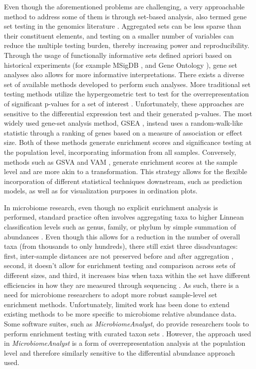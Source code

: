\documentclass[10pt,letterpaper]{article}
\begin{document}
Even though the aforementioned problems are challenging, a very approachable method to address some of them is through set-based analysis, also termed gene set testing in the genomics literature \cite{khatri2012, goeman2007}. Aggregated sets can be less sparse than their constituent elements, and testing on a smaller number of variables can reduce the multiple testing burden, thereby increasing power and reproducibility. Through the usage of functionally informative sets defined apriori based on historical experiments (for example MSigDB \cite{subramanian2005}, and Gene Ontology \cite{ashburner2000}), gene set analyses also allows for more informative interpretations. There exists a diverse set of available methods developed to perform such analyses. More traditional set testing methods utilize the hypergeometric test to test for the overrepresentation of significant p-values for a set of interest \cite{goeman2007}. Unfortunately, these approaches are sensitive to the differential expression test and their generated p-values. The most widely used gene-set analysis method, GSEA \cite{subramanian2005}, instead uses a random-walk-like statistic through a ranking of genes based on a measure of association or effect size. Both of these methods generate enrichment scores and significance testing at the population level, incorporating information from all samples. Conversely, methods such as GSVA \cite{hanzelmann2013} and VAM \cite{frost2020a}, generate enrichment scores at the sample level and are more akin to a transformation. This strategy allows for the flexible incorporation of different statistical techniques downstream, such as prediction models, as well as for visualization purposes in ordination plots.  

In microbiome research, even though no explicit enrichment analysis is performed, standard practice often involves aggregating taxa to higher Linnean classification levels such as genus, family, or phylum by simple summation of abundances \cite{mclaren2019}. Even though this allows for a reduction in the number of overall taxa (from thousands to only hundreds), there still exist three disadvantages: first, inter-sample distances are not preserved before and after aggregation \cite{egozcue2005}, second, it doesn't allow for enrichment testing and comparison across sets of different sizes, and third, it increases bias when taxa within the set have different efficiencies in how they are measured through sequencing \cite{mclaren2019}. As such, there is a need for microbiome researchers to adopt more robust sample-level set enrichment methods. Unfortunately, limited work has been done to extend existing methods to be more specific to microbiome relative abundance data. Some software suites, such as \emph{MicrobiomeAnalyst}, do provide researchers tools to perform enrichment testing with curated taxon sets \cite{chong2020}. However, the approach used in \emph{MicrobiomeAnalyst} is a form of overrepresentation analysis at the population level and therefore similarly sensitive to the differential abundance approach used. 
\end{document}
